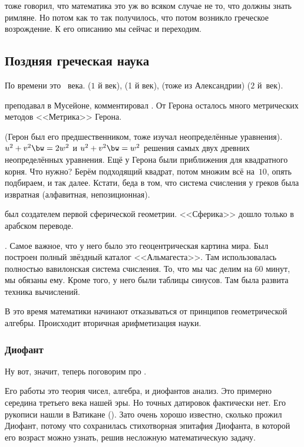 \documentclass[a4paper,oneside,fleqn,10pt]{article}
\begin{document}
 тоже говорил, что математика это уж во всяком случае не то, что должны знать римляне.
Но потом как то так получилось, что потом возникло греческое возрождение.
К его описанию мы сейчас и переходим.

\subsection{Поздняя греческая наука}

По времени это ~века.
 ($1$ й век),  (1 й век),
 (тоже из Александрии) ($2$ й~век).

 преподавал в Мусейоне, комментировал .
От Герона осталось много метрических методов <<Метрика>> Герона.

 (Герон был его предшественником, тоже изучал неопределённые уравнения).
$u^2 + v^2 \bw= 2w^2$ и $u^2 + v^2 \bw= w^2$ решения самых двух древних неопределённых уравнения.
Ещё у Герона были приближения для квадратного корня. Что нужно? Берём подходящий квадрат, потом множим всё на~$10$,
опять подбираем, и так далее. Кстати, беда в том, что система счисления у греков была извратная (алфавитная,
непозиционная).

 был создателем первой сферической геометрии. <<Сферика>> дошло только в арабском переводе.

. Самое важное, что у него было это геоцентрическая картина мира. Был построен полный
звёздный каталог <<Альмагеста>>. Там использовалась полностью вавилонская система счисления.
То, что мы час делим на 60 минут, мы обязаны ему. Кроме того, у него были таблицы синусов.
Там была развита техника вычислений.

В это время математики начинают отказываться от принципов геометрической
алгебры. Происходит вторичная арифметизация науки.

\subsubsection{Диофант}

Ну вот, значит, теперь поговорим про .

Его работы это теория чисел, алгебра, и диофантов анализ. Это примерно середина третьего века нашей эры.
Но точных датировок фактически нет. Его рукописи нашли в Ватикане ().
Зато очень хорошо известно, сколько прожил Диофант, потому что сохранилась
стихотворная эпитафия Диофанта, в которой его возраст можно узнать, решив несложную
математическую задачу.
\end{document}
